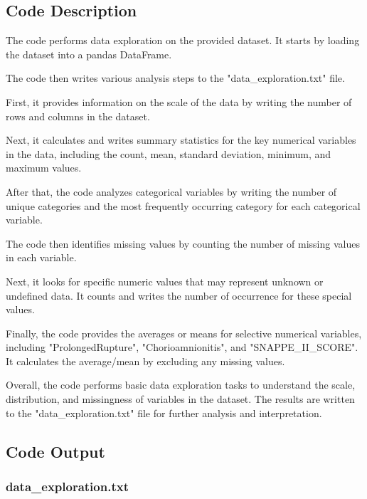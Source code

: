 \documentclass[11pt]{article}
\begin{document}
\subsection{Code Description}

The code performs data exploration on the provided dataset. It starts by loading the dataset into a pandas DataFrame.

The code then writes various analysis steps to the "data\_exploration.txt" file. 

First, it provides information on the scale of the data by writing the number of rows and columns in the dataset.

Next, it calculates and writes summary statistics for the key numerical variables in the data, including the count, mean, standard deviation, minimum, and maximum values.

After that, the code analyzes categorical variables by writing the number of unique categories and the most frequently occurring category for each categorical variable.

The code then identifies missing values by counting the number of missing values in each variable.

Next, it looks for specific numeric values that may represent unknown or undefined data. It counts and writes the number of occurrence for these special values.

Finally, the code provides the averages or means for selective numerical variables, including "ProlongedRupture", "Chorioamnionitis", and "SNAPPE\_II\_SCORE". It calculates the average/mean by excluding any missing values.

Overall, the code performs basic data exploration tasks to understand the scale, distribution, and missingness of variables in the dataset. The results are written to the "data\_exploration.txt" file for further analysis and interpretation.

\subsection{Code Output}

\subsubsection*{data\_exploration.txt}
\end{document}

